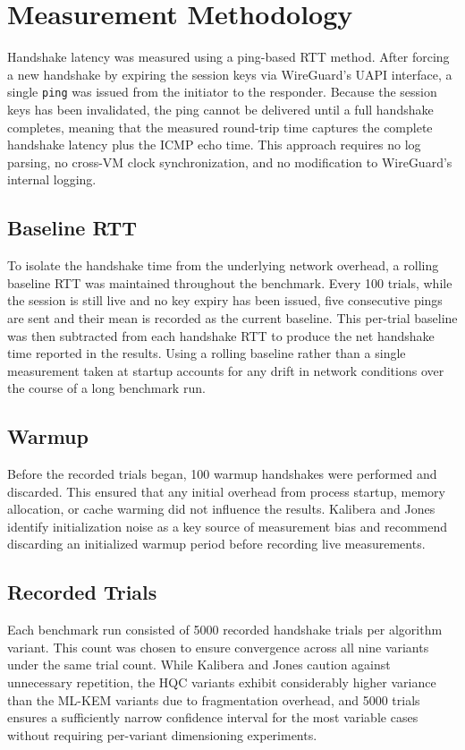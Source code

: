\section{Measurement Methodology}\label{sec:measurement}
Handshake latency was measured using a ping-based RTT method. After forcing a new handshake by expiring the session keys via WireGuard's UAPI interface, a single \texttt{ping} was issued from the initiator to the responder. Because the session keys has been invalidated, the ping cannot be delivered until a full handshake completes, meaning that the measured round-trip time captures the complete handshake latency plus the ICMP echo time. This approach requires no log parsing, no cross-VM clock synchronization, and no modification to WireGuard's internal logging. 

\subsection*{Baseline RTT} 
To isolate the handshake time from the underlying network overhead, a rolling baseline RTT was maintained throughout the benchmark. Every 100 trials, while the session is still live and no key expiry has been issued, five consecutive pings are sent and their mean is recorded as the current baseline. This per-trial baseline was then subtracted from each handshake RTT to produce the net handshake time reported in the results. Using a rolling baseline rather than a single measurement taken at startup accounts for any drift in network conditions over the course of a long benchmark run. 

\subsection*{Warmup} 
Before the recorded trials began, 100 warmup handshakes were performed and discarded. This ensured that any initial overhead from process startup, memory allocation, or cache warming did not influence the results. Kalibera and Jones \cite{kalibera2013} identify initialization noise as a key source of measurement bias and recommend discarding an initialized warmup period before recording live measurements.

\subsection*{Recorded Trials} 
Each benchmark run consisted of 5000 recorded handshake trials per algorithm variant. This count was chosen to ensure convergence across all nine variants under the same trial count. While Kalibera and Jones \cite{kalibera2013} caution against unnecessary repetition, the HQC variants exhibit considerably higher variance than the ML-KEM variants due to fragmentation overhead, and 5000 trials ensures a sufficiently narrow confidence interval for the most variable cases without requiring per-variant dimensioning experiments.

